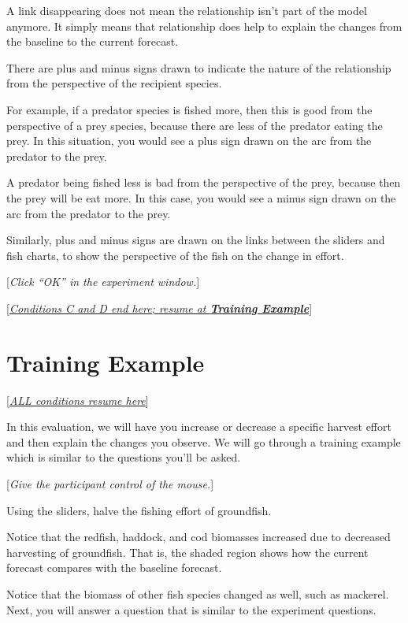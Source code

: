 {{{{\begin{minipage}{0.97\textwidth}
{A link disappearing does not mean the relationship isn't part of the model anymore.  It simply means that relationship does help to explain the changes from the baseline to the current forecast.

There are plus and minus signs drawn to indicate the nature of the relationship from the perspective of the recipient species.

For example, if a predator species is fished more, then this is good from the perspective of a prey species, because there are less of the predator eating the prey.  In this situation, you would see a plus sign drawn on the arc from the predator to the prey.

A predator being fished less is bad from the perspective of the prey, because then the prey will be eat more.  In this case, you would see a minus sign drawn on the arc from the predator to the prey.

Similarly, plus and minus signs are drawn on the links between the sliders and fish charts, to show the perspective of the fish on the change in effort.


[\textit{Click ``OK'' in the experiment window.}]

[\underline{\textit{Conditions C and D end here; resume at \textbf{Training Example}}}]
}
\end{minipage}
}

\section{Training Example}

[\underline{\textit{ALL conditions resume here}}]

In this evaluation, we will have you increase or decrease a specific harvest effort and then explain the changes you observe.  We will go through a training example which is similar to the questions you'll be asked.

[\textit{Give the participant control of the mouse.}]

Using the sliders, halve the fishing effort of groundfish.

Notice that the redfish, haddock, and cod biomasses increased due to decreased harvesting of groundfish.  That is, the shaded region shows how the current forecast compares with the baseline forecast.

Notice that the biomass of other fish species changed as well, such as mackerel. Next, you will answer a question that is similar to the experiment questions.

}}}

